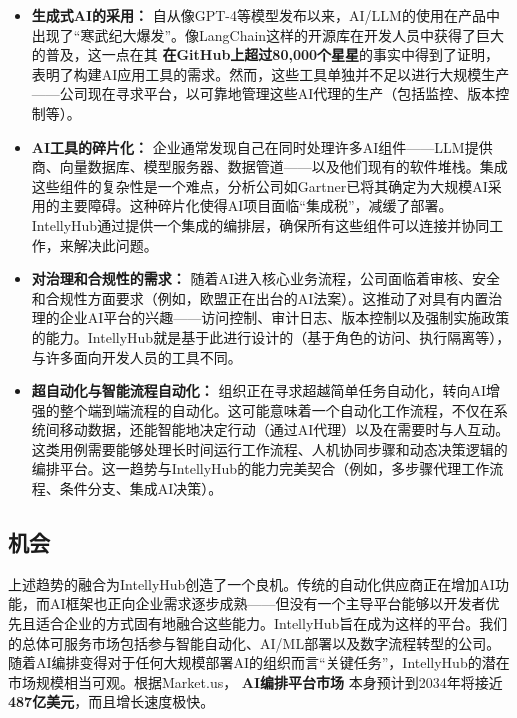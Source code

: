 \documentclass[11pt, a4paper, oneside]{article}
\begin{document}
\begin{itemize}
    \item \textbf{生成式AI的采用：} 自从像GPT-4等模型发布以来，AI/LLM的使用在产品中出现了“寒武纪大爆发”。像LangChain这样的开源库在开发人员中获得了巨大的普及，这一点在其 \textbf{在GitHub上超过80,000个星星}\cite{langchainGitHub}的事实中得到了证明，表明了构建AI应用工具的需求。然而，这些工具单独并不足以进行大规模生产——公司现在寻求平台，以可靠地管理这些AI代理的生产（包括监控、版本控制等）。
    
    \item \textbf{AI工具的碎片化：} 企业通常发现自己在同时处理许多AI组件——LLM提供商、向量数据库、模型服务器、数据管道——以及他们现有的软件堆栈。集成这些组件的复杂性是一个难点，分析公司如Gartner已将其确定为大规模AI采用的主要障碍\cite{gartnerAIBarriers}。这种碎片化使得AI项目面临“集成税”，减缓了部署。IntellyHub通过提供一个集成的编排层，确保所有这些组件可以连接并协同工作，来解决此问题。
    
    \item \textbf{对治理和合规性的需求：} 随着AI进入核心业务流程，公司面临着审核、安全和合规性方面要求（例如，欧盟正在出台的AI法案\cite{euAIAct}）。这推动了对具有内置治理的企业AI平台的兴趣——访问控制、审计日志、版本控制以及强制实施政策的能力。IntellyHub就是基于此进行设计的（基于角色的访问、执行隔离等），与许多面向开发人员的工具不同。
    
    \item \textbf{超自动化与智能流程自动化：} 组织正在寻求超越简单任务自动化，转向AI增强的整个端到端流程的自动化。这可能意味着一个自动化工作流程，不仅在系统间移动数据，还能智能地决定行动（通过AI代理）以及在需要时与人互动。这类用例需要能够处理长时间运行工作流程、人机协同步骤和动态决策逻辑的编排平台。这一趋势与IntellyHub的能力完美契合（例如，多步骤代理工作流程、条件分支、集成AI决策）。
\end{itemize}

\subsection{机会}
上述趋势的融合为IntellyHub创造了一个良机。传统的自动化供应商正在增加AI功能，而AI框架也正向企业需求逐步成熟——但没有一个主导平台能够以开发者优先且适合企业的方式固有地融合这些能力。IntellyHub旨在成为这样的平台。我们的总体可服务市场包括参与智能自动化、AI/ML部署以及数字流程转型的公司。随着AI编排变得对于任何大规模部署AI的组织而言“关键任务”，IntellyHub的潜在市场规模相当可观。根据Market.us， \textbf{AI编排平台市场} 本身预计到2034年将接近 \textbf{487亿美元}\cite{AIOrch}，而且增长速度极快。
\end{document}

